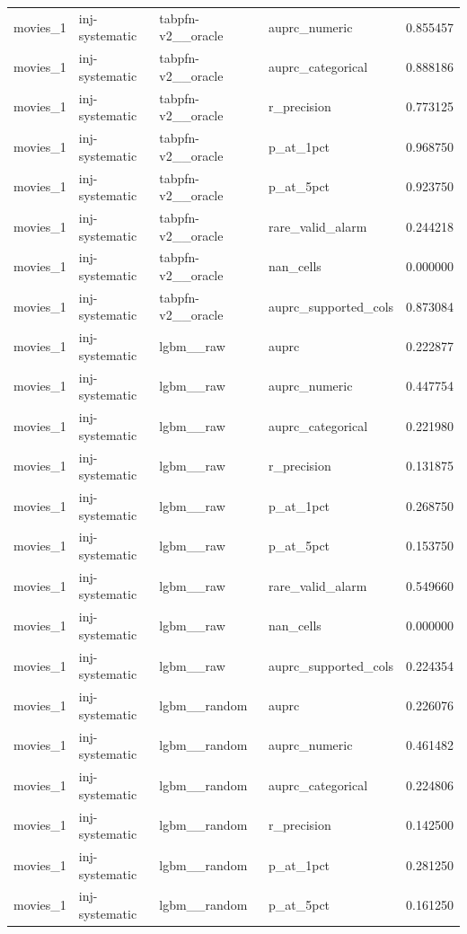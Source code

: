 \begin{tabular}{lllll}
movies\_1 & inj-systematic & tabpfn-v2\_\_oracle & auprc\_numeric & 0.855457 \\
movies\_1 & inj-systematic & tabpfn-v2\_\_oracle & auprc\_categorical & 0.888186 \\
movies\_1 & inj-systematic & tabpfn-v2\_\_oracle & r\_precision & 0.773125 \\
movies\_1 & inj-systematic & tabpfn-v2\_\_oracle & p\_at\_1pct & 0.968750 \\
movies\_1 & inj-systematic & tabpfn-v2\_\_oracle & p\_at\_5pct & 0.923750 \\
movies\_1 & inj-systematic & tabpfn-v2\_\_oracle & rare\_valid\_alarm & 0.244218 \\
movies\_1 & inj-systematic & tabpfn-v2\_\_oracle & nan\_cells & 0.000000 \\
movies\_1 & inj-systematic & tabpfn-v2\_\_oracle & auprc\_supported\_cols & 0.873084 \\
movies\_1 & inj-systematic & lgbm\_\_raw & auprc & 0.222877 \\
movies\_1 & inj-systematic & lgbm\_\_raw & auprc\_numeric & 0.447754 \\
movies\_1 & inj-systematic & lgbm\_\_raw & auprc\_categorical & 0.221980 \\
movies\_1 & inj-systematic & lgbm\_\_raw & r\_precision & 0.131875 \\
movies\_1 & inj-systematic & lgbm\_\_raw & p\_at\_1pct & 0.268750 \\
movies\_1 & inj-systematic & lgbm\_\_raw & p\_at\_5pct & 0.153750 \\
movies\_1 & inj-systematic & lgbm\_\_raw & rare\_valid\_alarm & 0.549660 \\
movies\_1 & inj-systematic & lgbm\_\_raw & nan\_cells & 0.000000 \\
movies\_1 & inj-systematic & lgbm\_\_raw & auprc\_supported\_cols & 0.224354 \\
movies\_1 & inj-systematic & lgbm\_\_random & auprc & 0.226076 \\
movies\_1 & inj-systematic & lgbm\_\_random & auprc\_numeric & 0.461482 \\
movies\_1 & inj-systematic & lgbm\_\_random & auprc\_categorical & 0.224806 \\
movies\_1 & inj-systematic & lgbm\_\_random & r\_precision & 0.142500 \\
movies\_1 & inj-systematic & lgbm\_\_random & p\_at\_1pct & 0.281250 \\
movies\_1 & inj-systematic & lgbm\_\_random & p\_at\_5pct & 0.161250 \\

\end{tabular}
